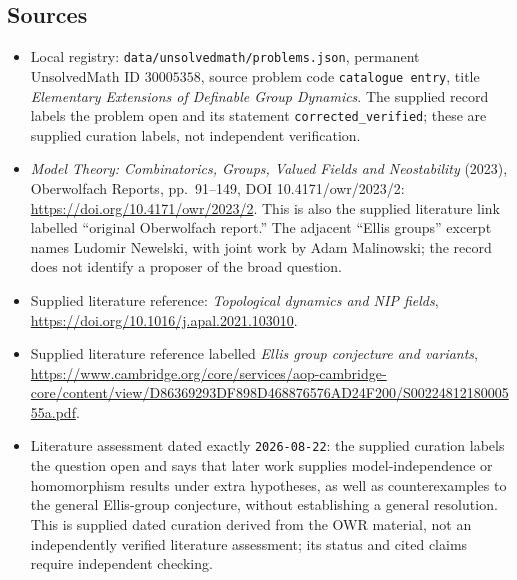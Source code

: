 \documentclass[11pt]{article}
\begin{document}
\subsection{Sources}
\begin{itemize}
\item Local registry: \texttt{data/unsolvedmath/problems.json}, permanent UnsolvedMath ID \(30005358\), source problem code \texttt{catalogue entry}, title \emph{Elementary Extensions of Definable Group Dynamics}. The supplied record labels the problem open and its statement \texttt{corrected\_verified}; these are supplied curation labels, not independent verification.
\item \emph{Model Theory: Combinatorics, Groups, Valued Fields and Neostability} (2023), Oberwolfach Reports, pp.\ 91--149, DOI 10.4171/owr/2023/2: \url{https://doi.org/10.4171/owr/2023/2}. This is also the supplied literature link labelled ``original Oberwolfach report.'' The adjacent ``Ellis groups'' excerpt names Ludomir Newelski, with joint work by Adam Malinowski; the record does not identify a proposer of the broad question.
\item Supplied literature reference: \emph{Topological dynamics and NIP fields}, \url{https://doi.org/10.1016/j.apal.2021.103010}.
\item Supplied literature reference labelled \emph{Ellis group conjecture and variants}, \url{https://www.cambridge.org/core/services/aop-cambridge-core/content/view/D86369293DF898D468876576AD24F200/S0022481218000555a.pdf}.
\item Literature assessment dated exactly \texttt{2026-08-22}: the supplied curation labels the question open and says that later work supplies model-independence or homomorphism results under extra hypotheses, as well as counterexamples to the general Ellis-group conjecture, without establishing a general resolution. This is supplied dated curation derived from the OWR material, not an independently verified literature assessment; its status and cited claims require independent checking.
\end{itemize}
\end{document}
